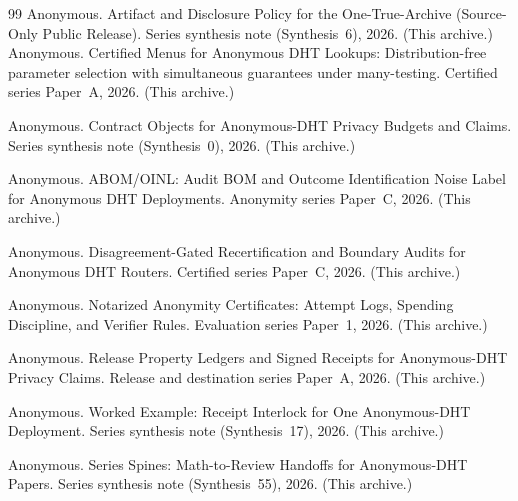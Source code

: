 \documentclass[11pt]{article}
\begin{document}
\begin{thebibliography}{99}\small
{}
Anonymous.
\newblock Artifact and Disclosure Policy for the One-True-Archive (Source-Only Public Release).
\newblock Series synthesis note (Synthesis~6), 2026. (This archive.)
Anonymous.
\newblock Certified Menus for Anonymous DHT Lookups: Distribution-free parameter selection with simultaneous guarantees under many-testing.
\newblock Certified series Paper~A, 2026. (This archive.)

Anonymous.
\newblock Contract Objects for Anonymous-DHT Privacy Budgets and Claims.
\newblock Series synthesis note (Synthesis~0), 2026. (This archive.)

Anonymous.
\newblock ABOM/OINL: Audit BOM and Outcome Identification Noise Label for Anonymous DHT Deployments.
\newblock Anonymity series Paper~C, 2026. (This archive.)

Anonymous.
\newblock Disagreement-Gated Recertification and Boundary Audits for Anonymous DHT Routers.
\newblock Certified series Paper~C, 2026. (This archive.)

Anonymous.
\newblock Notarized Anonymity Certificates: Attempt Logs, Spending Discipline, and Verifier Rules.
\newblock Evaluation series Paper~1, 2026. (This archive.)

Anonymous.
\newblock Release Property Ledgers and Signed Receipts for Anonymous-DHT Privacy Claims.
\newblock Release and destination series Paper~A, 2026. (This archive.)

Anonymous.
\newblock Worked Example: Receipt Interlock for One Anonymous-DHT Deployment.
\newblock Series synthesis note (Synthesis~17), 2026. (This archive.)

Anonymous.
\newblock Series Spines: Math-to-Review Handoffs for Anonymous-DHT Papers.
\newblock Series synthesis note (Synthesis~55), 2026. (This archive.)

\end{thebibliography}
\end{document}
